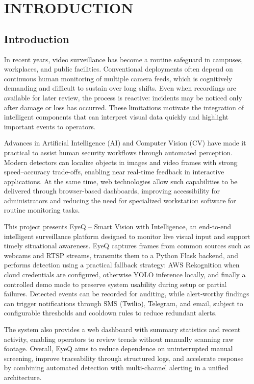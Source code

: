 \documentclass[10pt,openany]{report}
\begin{document}
\begin{sloppypar}
{{{\begin{sloppypar}
\chapter{INTRODUCTION}
\section{Introduction}
\hspace{0.5cm}
In recent years, video surveillance has become a routine safeguard in campuses, workplaces, and public facilities. Conventional deployments often depend on continuous human monitoring of multiple camera feeds, which is cognitively demanding and difficult to sustain over long shifts. Even when recordings are available for later review, the process is reactive: incidents may be noticed only after damage or loss has occurred. These limitations motivate the integration of intelligent components that can interpret visual data quickly and highlight important events to operators.

Advances in Artificial Intelligence (AI) and Computer Vision (CV) have made it practical to assist human security workflows through automated perception. Modern detectors can localize objects in images and video frames with strong speed--accuracy trade-offs, enabling near real-time feedback in interactive applications. At the same time, web technologies allow such capabilities to be delivered through browser-based dashboards, improving accessibility for administrators and reducing the need for specialized workstation software for routine monitoring tasks.

This project presents EyeQ -- Smart Vision with Intelligence, an end-to-end intelligent surveillance platform designed to monitor live visual input and support timely situational awareness. EyeQ captures frames from common sources such as webcams and RTSP streams, transmits them to a Python Flask backend, and performs detection using a practical fallback strategy: AWS Rekognition when cloud credentials are configured, otherwise YOLO inference locally, and finally a controlled demo mode to preserve system usability during setup or partial failures. Detected events can be recorded for auditing, while alert-worthy findings can trigger notifications through SMS (Twilio), Telegram, and email, subject to configurable thresholds and cooldown rules to reduce redundant alerts.

The system also provides a web dashboard with summary statistics and recent activity, enabling operators to review trends without manually scanning raw footage. Overall, EyeQ aims to reduce dependence on uninterrupted manual screening, improve traceability through structured logs, and accelerate response by combining automated detection with multi-channel alerting in a unified architecture.


\end{sloppypar}}}}
\end{sloppypar}
\end{document}
